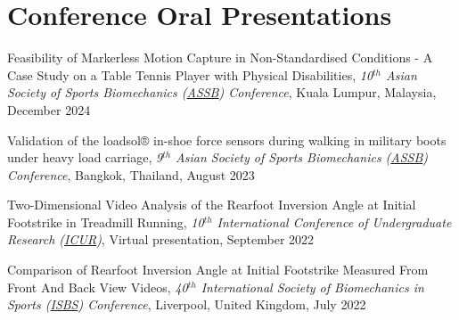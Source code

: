 \documentclass[../main.tex]{subfiles}
\begin{document}



\section{Conference Oral Presentations}
  \vspace{2pt}
    \resumeSubHeadingListStart
    \item
        \def\labelprefix{CP}
        \begin{etaremune}
            \item\label{conference_pre: assb2024} {Feasibility of Markerless Motion Capture in Non-Standardised Conditions - A Case Study on a Table Tennis Player with Physical Disabilities, \textit{10$^{th}$ Asian Society of Sports Biomechanics (\href{http://www.assbweb.org/}{ASSB}) Conference}, Kuala Lumpur, Malaysia, December 2024}
             
            \item\label{conference_pre: assb2023} {Validation of the loadsol® in-shoe force sensors during walking in military boots under heavy load carriage, \textit{9$^{th}$ Asian Society of Sports Biomechanics (\href{http://www.assbweb.org/}{ASSB}) Conference}, Bangkok, Thailand, August 2023}
            
            \item\label{conference_pre: icur2022} {Two-Dimensional Video Analysis of the Rearfoot Inversion Angle at Initial Footstrike in Treadmill Running, \textit{10$^{th}$ International Conference of Undergraduate Research (\href{https://www.icurportal.com/}{ICUR})}, Virtual presentation, September 2022}
            
            \item\label{conference_pre: isbs2022} {Comparison of Rearfoot Inversion Angle at Initial Footstrike Measured From Front And Back View Videos, \textit{40$^{th}$ International Society of Biomechanics in Sports (\href{https://isbs.org/}{ISBS}) Conference}, Liverpool, United Kingdom, July 2022}
        \end{etaremune}
    \resumeSubHeadingListEnd
\end{document}
